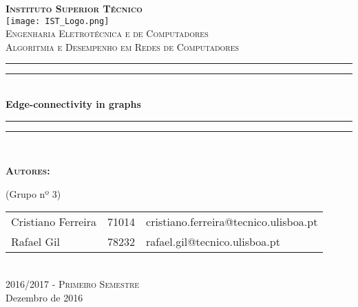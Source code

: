 \documentclass[12pt]{article}
\begin{document}
\begin{titlepage}
	
\thispagestyle{empty}
\newcommand{\HRule}{\rule{\linewidth}{0.5mm}} %
\center
\textsc{\bfseries\LARGE Instituto Superior Técnico}\\[1cm] %
\texttt{[image: IST\_Logo.png]}\\[2.5cm]
\textsc{\Large Engenharia Eletrotécnica e de Computadores}\\[0.5cm] %
\textsc{\large Algoritmia e Desempenho em Redes de Computadores}\\[0.5cm] %

\rule{\textwidth}{1.6pt}\vspace*{-\baselineskip}\vspace*{2pt} %
\rule{\textwidth}{0.4pt}\\[\baselineskip] %

{\Huge \bfseries Edge-connectivity in graphs}\\[0.2cm] %

\rule{\textwidth}{0.4pt}\vspace*{-\baselineskip}\vspace{3.2pt} %
\rule{\textwidth}{1.6pt}\\[2.5cm]


\begin{minipage}{0.9\textwidth}
	\begin{flushleft} \large
		\begin{Large}\bfseries\textsc{Autores:}\end{Large} (\small Grupo nº 3)\\[0.4cm]
		\begin{tabular}{l l l} 
			
			Cristiano Ferreira & 71014 & \normalsize cristiano.ferreira@tecnico.ulisboa.pt \\ 
			Rafael Gil & 78232 & \normalsize rafael.gil@tecnico.ulisboa.pt\\	
			
		\end{tabular}
	\end{flushleft}
\end{minipage}\\[2.5cm]
	
\large\textsc{ 2016/2017 - Primeiro Semestre }\\
\large Dezembro de 2016\\[1cm]


\end{titlepage}
\end{document}
